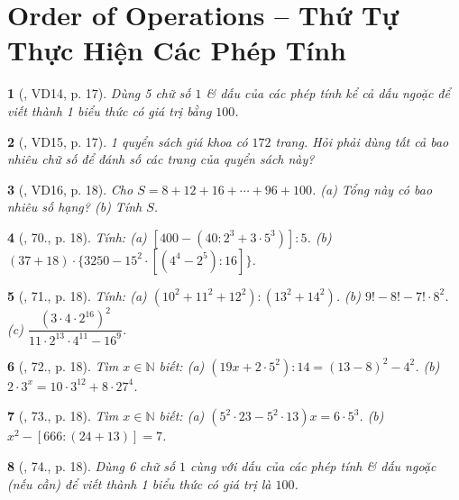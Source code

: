 \documentclass{article}
\newtheorem{baitoan}{}
\begin{document}
\section{Order of Operations -- Thứ Tự Thực Hiện Các Phép Tính}

\begin{baitoan}[\cite{Tuyen_Toan_6}, VD14, p. 17]
	Dùng 5 chữ số $1$ \& dấu của các phép tính kể cả dấu ngoặc để viết thành 1 biểu thức có giá trị bằng $100$.
\end{baitoan}

\begin{baitoan}[\cite{Tuyen_Toan_6}, VD15, p. 17]
	1 quyển sách giá khoa có $172$ trang. Hỏi phải dùng tất cả bao nhiêu chữ số để đánh số các trang của quyển sách này?
\end{baitoan}

\begin{baitoan}[\cite{Tuyen_Toan_6}, VD16, p. 18]
	Cho $S = 8 + 12 + 16 + \cdots + 96 +100$. (a) Tổng này có bao nhiêu số hạng? (b) Tính $S$.
\end{baitoan}

\begin{baitoan}[\cite{Tuyen_Toan_6}, 70., p. 18]
	Tính: (a) $[400 - (40:2^3 + 3\cdot5^3)]:5$. (b) $(37 + 18)\cdot\{3250 - 15^2\cdot[(4^4 - 2^5):16]\}$.
\end{baitoan}

\begin{baitoan}[\cite{Tuyen_Toan_6}, 71., p. 18]
	Tính: (a) $(10^2 + 11^2 + 12^2):(13^2 + 14^2)$. (b) $9! - 8! - 7!\cdot8^2$. (c) $\dfrac{(3\cdot4\cdot2^{16})^2}{11\cdot2^{13}\cdot4^{11} - 16^9}$.
\end{baitoan}

\begin{baitoan}[\cite{Tuyen_Toan_6}, 72., p. 18]
	Tìm $x\in\mathbb{N}$ biết: (a) $(19x + 2\cdot5^2):14 = (13 - 8)^2 - 4^2$. (b) $2\cdot3^x = 10\cdot3^{12} + 8\cdot27^4$. 
\end{baitoan}

\begin{baitoan}[\cite{Tuyen_Toan_6}, 73., p. 18]
	Tìm $x\in\mathbb{N}$ biết: (a) $(5^2\cdot23 - 5^2\cdot13)x = 6\cdot5^3$. (b) $x^2 - [666:(24 + 13)] = 7$.
\end{baitoan}

\begin{baitoan}[\cite{Tuyen_Toan_6}, 74., p. 18]
	Dùng 6 chữ số $1$ cùng với dấu của các phép tính \& dấu ngoặc (nếu cần) để viết thành 1 biểu thức có giá trị là $100$.
\end{baitoan}
\end{document}
